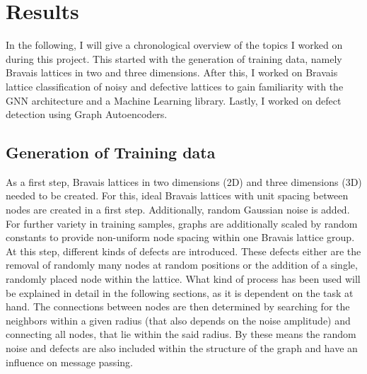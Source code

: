 \documentclass[11pt,a4paper]{article}
\begin{document}
\section{Results}
\label{sec:Results}
In the following, I will give a chronological overview of the topics I worked on during this project. 
This started with the generation of training data, namely Bravais lattices in two and three dimensions. After this, I worked on Bravais lattice classification of noisy and defective lattices to gain familiarity with the GNN architecture and a Machine Learning library. Lastly, I worked on defect detection using Graph Autoencoders. 

\subsection{Generation of Training data}
\label{ssec:Generation of training data}
As a first step, Bravais lattices in two dimensions (2D) and three dimensions (3D) needed to be created. 
For this, ideal Bravais lattices with unit spacing between nodes are created in a first step. 
Additionally, random Gaussian noise is added. 
For further variety in training samples, graphs are additionally scaled by random constants to provide non-uniform node spacing within one Bravais lattice group. 
At this step, different kinds of defects are introduced. 
These defects either are the removal of randomly many nodes at random positions or the addition of a single, randomly placed node within the lattice. 
What kind of process has been used will be explained in detail in the following sections, as it is dependent on the task at hand. 
The connections between nodes are then determined by searching for the neighbors within a given radius (that also depends on the noise amplitude) and connecting all nodes, that lie within the said radius. 
By these means the random noise and defects are also included within the structure of the graph and have an influence on message passing. \\
\end{document}
